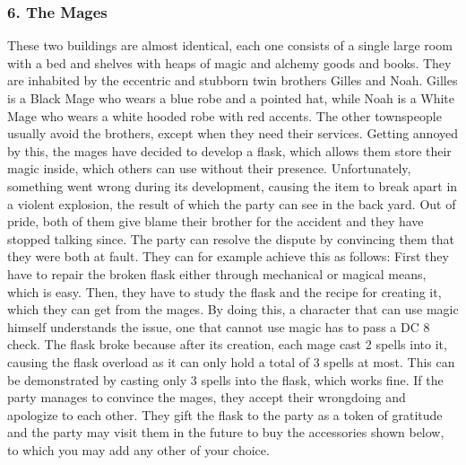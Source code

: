 \subsubsection*{6. The Mages}
These two buildings are almost identical, each one consists of a single large room with a bed and shelves with heaps of magic and alchemy goods and books.
They are inhabited by the eccentric and stubborn twin brothers Gilles and Noah. 
Gilles is a Black Mage who wears a blue robe and a pointed hat, while Noah is a White Mage who wears a white hooded robe with red accents.
The other townspeople usually avoid the brothers, except when they need their services.
Getting annoyed by this, the mages have decided to develop a flask, which allows them store their magic inside, which others can use without their presence.
Unfortunately, something went wrong during its development, causing the item to break apart in a violent explosion, the result of which the party can see in the back yard.
Out of pride, both of them give blame their brother for the accident and they have stopped talking since.
The party can resolve the dispute by convincing them that they were both at fault.
They can for example achieve this as follows:
First they have to repair the broken flask either through mechanical or magical means, which is easy.
Then, they have to study the flask and the recipe for creating it, which they can get from the mages.
By doing this, a character that can use magic himself understands the issue, one that cannot use magic has to pass a DC 8 check.
The flask broke because after its creation, each mage cast 2 spells into it, causing the flask overload as it can only hold a total of 3 spells at most.
This can be demonstrated by casting only 3 spells into the flask, which works fine.
If the party manages to convince the mages, they accept their wrongdoing and apologize to each other.
They gift the flask to the party as a token of gratitude and the party may visit them in the future to buy the accessories shown below, to which you may add any other of your choice.
\vspace{0.3cm}

